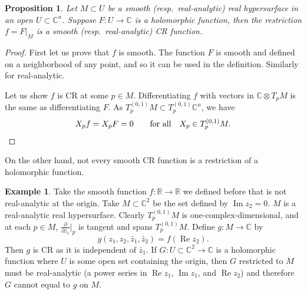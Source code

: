 \documentclass[12pt,openany]{book}
\renewcommand{\Re}{\operatorname{Re}}
\renewcommand{\Im}{\operatorname{Im}}
\newcommand{\C}{{\mathbb{C}}}
\newcommand{\R}{{\mathbb{R}}}
\theoremstyle{plain}
\newtheorem{prop}[thm]{Proposition}
\theoremstyle{remark}
\theoremstyle{definition}
\theoremstyle{exercise}
\theoremstyle{example}
\newtheorem{example}[thm]{Example}
\begin{document}
\begin{prop}
Let $M \subset U$ be a smooth (resp.\ real-analytic) real hypersurface in an
open $U
\subset \C^n$.  Suppose $F \colon U \to \C$ is a holomorphic function,
then the restriction $f = F|_M$ is a smooth (resp.\ real-analytic) CR function.
\end{prop}

\begin{proof}
First let us prove that $f$ is smooth.  The function $F$ is smooth and
defined on a neighborhood of any point, and so it can be used in the
definition.
Similarly for real-analytic.

Let us show $f$ is CR at some $p \in M$.
Differentiating $f$ with vectors in $\C \otimes
T_pM$ is the same as differentiating $F$.
As $T_p^{(0,1)} M \subset T_p^{(0,1)} \C^n$, we have
\begin{equation*}
X_p f = X_p F = 0 \qquad \text{for all} \quad X_p \in T_p^{(0,1)} M.
\qedhere
\end{equation*}
\end{proof}

On the other hand, not every smooth CR function is a restriction of a holomorphic function.

\begin{example}
Take the smooth function $f \colon \R \to \R$ we defined before
that is not real-analytic at the origin.
Take $M \subset \C^2$ be the set defined by $\Im z_2 = 0$.
$M$ is a
real-analytic real hypersurface.  Clearly
$T_p^{(0,1)} M$ is one-complex-dimensional, and at each $p \in M$,
$\frac{\partial}{\partial \bar{z}_1}\big|_p$ is tangent and spans
$T_p^{(0,1)} M$.  Define $g \colon M \to \C$ by
\begin{equation*}
g(z_1,z_2,\bar{z}_1,\bar{z}_2) = f(\Re z_2) .
\end{equation*}
Then $g$ is CR as it is independent of $\bar{z}_1$.
If $G \colon U \subset \C^2 \to \C$ is a holomorphic
function where $U$ is some open set containing the origin, then $G$
restricted to $M$ must be real-analytic (a power series in $\Re z_1$, $\Im
z_1$, and $\Re z_2$) and therefore $G$ cannot equal to 
$g$ on $M$.
\end{example}
\end{document}
